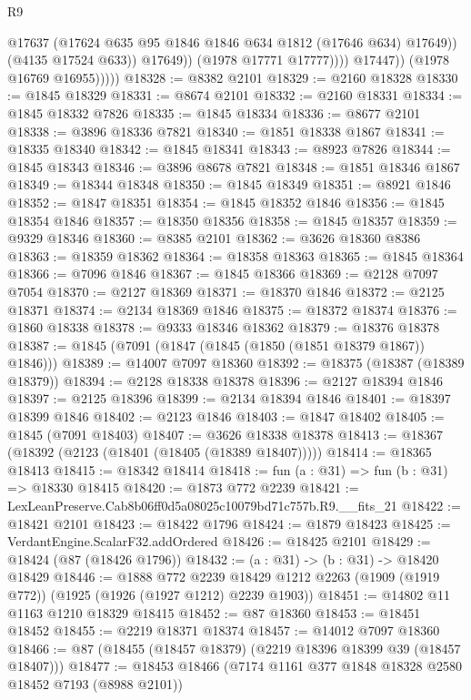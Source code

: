 \begin{lexlean}{R9}
\begin{coremodule}
                              @17637
                              (@17624 @635 @95 @1846 @1846 @634 @1812 (@17646 @634) @17649))
                            (@4135 @17524 @633))
                          @17649))
                      (@1978 @17771 @17777))))
                @17447))
            (@1978 @16769 @16955)))))
@18328 := @8382 @2101
@18329 := @2160 @18328
@18330 := @1845 @18329
@18331 := @8674 @2101
@18332 := @2160 @18331
@18334 := @1845 @18332 @7826
@18335 := @1845 @18334
@18336 := @8677 @2101
@18338 := @3896 @18336 @7821
@18340 := @1851 @18338 @1867
@18341 := @18335 @18340
@18342 := @1845 @18341
@18343 := @8923 @7826
@18344 := @1845 @18343
@18346 := @3896 @8678 @7821
@18348 := @1851 @18346 @1867
@18349 := @18344 @18348
@18350 := @1845 @18349
@18351 := @8921 @1846
@18352 := @1847 @18351
@18354 := @1845 @18352 @1846
@18356 := @1845 @18354 @1846
@18357 := @18350 @18356
@18358 := @1845 @18357
@18359 := @9329 @18346
@18360 := @8385 @2101
@18362 := @3626 @18360 @8386
@18363 := @18359 @18362
@18364 := @18358 @18363
@18365 := @1845 @18364
@18366 := @7096 @1846
@18367 := @1845 @18366
@18369 := @2128 @7097 @7054
@18370 := @2127 @18369
@18371 := @18370 @1846
@18372 := @2125 @18371
@18374 := @2134 @18369 @1846
@18375 := @18372 @18374
@18376 := @1860 @18338
@18378 := @9333 @18346 @18362
@18379 := @18376 @18378
@18387 := @1845 (@7091 (@1847 (@1845 (@1850 (@1851 @18379 @1867)) @1846)))
@18389 := @14007 @7097 @18360
@18392 := @18375 (@18387 (@18389 @18379))
@18394 := @2128 @18338 @18378
@18396 := @2127 @18394 @1846
@18397 := @2125 @18396
@18399 := @2134 @18394 @1846
@18401 := @18397 @18399 @1846
@18402 := @2123 @1846
@18403 := @1847 @18402
@18405 := @1845 (@7091 @18403)
@18407 := @3626 @18338 @18378
@18413 := @18367 (@18392 (@2123 (@18401 (@18405 (@18389 @18407)))))
@18414 := @18365 @18413
@18415 := @18342 @18414
@18418 := fun (a : @31) => fun (b : @31) => @18330 @18415
@18420 := @1873 @772 @2239
@18421 := LexLeanPreserve.Cab8b06ff0d5a08025c10079bd71c757b.R9.__fits_21
@18422 := @18421 @2101
@18423 := @18422 @1796
@18424 := @1879 @18423
@18425 := VerdantEngine.ScalarF32.addOrdered
@18426 := @18425 @2101
@18429 := @18424 (@87 (@18426 @1796))
@18432 := (a : @31) -> (b : @31) -> @18420 @18429
@18446 := @1888
    @772
    @2239
    @18429
    @1212
    @2263
    (@1909 (@1919 @772))
    (@1925 (@1926 (@1927 @1212) @2239 @1903))
@18451 := @14802 @11 @1163 @1210 @18329 @18415
@18452 := @87 @18360
@18453 := @18451 @18452
@18455 := @2219 @18371 @18374
@18457 := @14012 @7097 @18360
@18466 := @87 (@18455 (@18457 @18379) (@2219 @18396 @18399 @39 (@18457 @18407)))
@18477 := @18453 @18466 (@7174 @1161 @377 @1848 @18328 @2580 @18452 @7193 (@8988 @2101))

\end{coremodule}
\end{lexlean}

